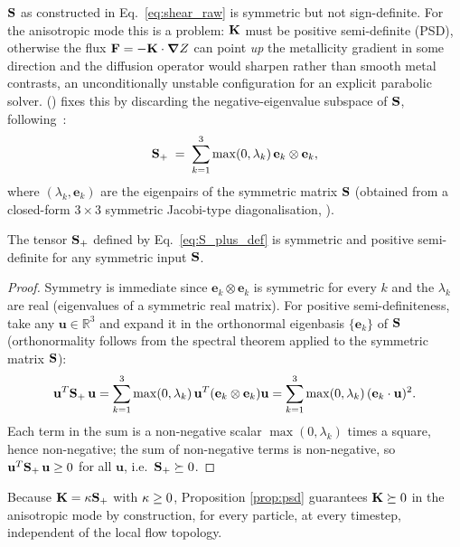 $\mathbf{S}$ as constructed in Eq.~\eqref{eq:shear_raw} is symmetric but not
sign-definite. For the anisotropic mode this is a problem: $\mathbf{K}$ must
be positive semi-definite (PSD), otherwise the flux $\mathbf{F} = -\mathbf{K}
\cdot\grad Z$ can point \emph{up} the metallicity gradient in some
direction and the diffusion operator would sharpen rather than smooth
metal contrasts, an unconditionally unstable configuration for an
explicit parabolic solver. 
() fixes this by discarding the
negative-eigenvalue subspace of $\mathbf{S}$, following~\cite{Balarac2013}:
\begin{equation}
  \label{eq:S_plus_def}
  \mathbf{S}_{+} \;=\; \sum_{k=1}^{3} \max(0,\lambda_k)\, \mathbf e_k \otimes \mathbf e_k ,
\end{equation}
where $(\lambda_k, \mathbf e_k)$ are the eigenpairs of the symmetric
matrix $\mathbf{S}$ (obtained from a closed-form $3\times3$ symmetric
Jacobi-type diagonalisation, ).

\begin{proposition}
\label{prop:psd}
The tensor $\mathbf{S}_{+}$ defined by Eq.~\eqref{eq:S_plus_def} is symmetric
and positive semi-definite for any symmetric input $\mathbf{S}$.
\end{proposition}
\begin{proof}
Symmetry is immediate since $\mathbf e_k\otimes\mathbf e_k$ is symmetric
for every $k$ and the $\lambda_k$ are real (eigenvalues of a symmetric
real matrix). For positive semi-definiteness, take any
$\mathbf u \in \mathbb R^3$ and expand it in the orthonormal eigenbasis
$\{\mathbf e_k\}$ of $\mathbf{S}$ (orthonormality follows from the spectral
theorem applied to the symmetric matrix $\mathbf{S}$):
\begin{equation}
  \mathbf u^T \mathbf{S}_{+}\, \mathbf u
  = \sum_{k=1}^3 \max(0,\lambda_k)\, \mathbf u^T (\mathbf e_k \otimes \mathbf e_k) \mathbf u
  = \sum_{k=1}^3 \max(0,\lambda_k)\, (\mathbf e_k \cdot \mathbf u)^2 .
\end{equation}
Each term in the sum is a non-negative scalar $\max(0,\lambda_k)$ times a
square, hence non-negative; the sum of non-negative terms is
non-negative, so $\mathbf u^T \mathbf{S}_{+}\,\mathbf u \geq 0$ for all
$\mathbf u$, i.e.\ $\mathbf{S}_{+} \succeq 0$.
\end{proof}

Because $\mathbf{K} = \kappa \mathbf{S}_{+}$ with $\kappa \geq 0$, Proposition
\ref{prop:psd} guarantees $\mathbf{K} \succeq 0$ in the anisotropic mode by
construction, for every particle, at every timestep, independent of the
local flow topology.

